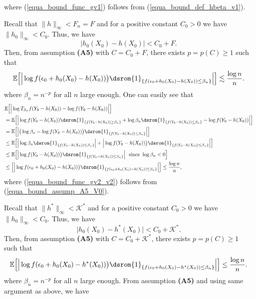 \documentclass[10pt,twoside]{article}
\numberwithin{equation}{section}
\newcommand{\E}{\ensuremath{\mathbb{E}}}
\def \ind{\textrm{\dsrom{1}}}
\begin{document}
%
%
where (\ref{equa_bound_func_gv1}) follows from (\ref{equa_bound_def_hbeta_v1}).

Recall that $\|h\|_{\infty} < F_n=F$ and for a positive constant $C_0 > 0$ we have $\|h_0\|_{\infty} < C_0$. Thus, we have 
%
\[\big|h_0(X_0) - h(X_0) \big| < C_0 + F.
\]
%
Then, from assumption \textbf{(A5)} with $C = C_0 + F$, there exists $p = p(C) \ge 1$ such that
%
\begin{equation}\label{equa_bound_assump_A5_V0} 
\E\Big[\Big|\log f(\epsilon_0 + h_0(X_0) - h(X_0)) \big) \ind_{\{f(\epsilon_0 + h_0(X_0) - h(X_0)) \leq \beta_n \}} \Big| \Big] \lesssim \dfrac{\log n}{n}.
\end{equation}
%
where $\beta_n = n^{-p}$ for all $n$ large enough.
One can easily see that
%
\begin{align}\label{equa_bound_func_gv2_v2}
    \nonumber & \E\Big[\Big|\log T_{\beta_n} f(Y_0 - h(X_0)) - \log f(Y_0 - h(X_0)) \Big| \Big] \\
    \nonumber & = \E\Big[\Big|\log f(Y_0 - h(X_0)) \ind_{\{f(Y_0 - h(X_0)) \ge \beta_n\}} + \log \beta_n \ind_{\{f(Y_0 - h(X_0)) \leq \beta_n\}}  - \log f(Y_0 - h(X_0)) \Big| \Big]  \\
 \nonumber  & =  \E\Big[\Big|\big( \log \beta_n - \log f(Y_0 - h(X_0)) \big) \ind_{\{f(Y_0 - h(X_0)) \leq \beta_n\}} \Big| \Big]\\
\nonumber & \leq \E\Big[\Big|\log \beta_n \ind_{\{f(Y_0 - h(X_0)) \leq \beta_n\}} \Big| +   \Big| \log f(Y_0 - h(X_0)) \big) \ind_{\{f(Y_0 - h(X_0))\leq \beta_n\}} \Big| \Big] \\
 \nonumber & \leq \E\Big[\Big| \log f(Y_0 - h(X_0)) \big) \ind_{\{f(Y_0 - h(X_0)) \leq \beta_n\}} \Big| ~ \text{ since } \log \beta_n < 0 \Big] 
 \\
  & \leq  \Big[\Big| \log f(\epsilon_0 + h_0(X_0)- h(X_0)) \big) \ind_{\{f(\epsilon_0 + h_0(X_0) - h(X_0)) \leq \beta_n\}} \Big| \Big]  \leq\dfrac{\log n}{n},
\end{align}
%
where (\ref{equa_bound_func_gv2_v2}) follows from (\ref{equa_bound_assump_A5_V0}). 

\medskip

Recall that $\|h^*\|_{\infty} < \mathcal{K}^*$ and for a positive constant $C_0 > 0$ we have $\|h_0\|_{\infty} < C_0$. Thus, we have 
%
\[\big|h_0(X_0) - h^*(X_0) \big| < C_0 + \mathcal{K}^*.
\]
%
Then, from assumption \textbf{(A5)} with $C = C_0 + \mathcal{K}^*$, there exists $p = p(C) \ge 1$ such that
%
\begin{equation}\label{equa_bound_assump_A5_V2} 
\E\Big[\Big|\log f(\epsilon_0 + h_0(X_0) - h^*(X_0)) \big) \ind_{\{f(\epsilon_0 + h_0(X_0) - h^*(X_0)) \leq \beta_n \}} \Big| \Big] \leq \dfrac{\log n}{n}.
\end{equation}
%
where $\beta_n = n^{-p}$ for all $n$ large enough.
%
From assumption \textbf{(A5)} and using same argument as above, we have
%
\end{document}
